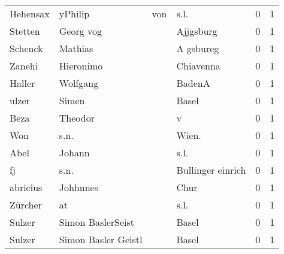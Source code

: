 \documentclass[10pt,a4paper,landscape]{article}
\begin{document}
\begin{longtable}{llllrr}
                 Hehensax &                            yPhilip &         von &                                        s.l. &          0 &         1 \\
                  Stetten &                          Georg vog &             &                                   Ajjgsburg &          0 &         1 \\
                  Schenck &                            Mathias &             &                                   A gsbureg &          0 &         1 \\
                   Zanehi &                          Hieronimo &             &                                   Chiavenna &          0 &         1 \\
                   Haller &                           Wolfgang &             &                                      BadenA &          0 &         1 \\
                    ulzer &                              Simen &             &                                       Basel &          0 &         1 \\
                     Beza &                            Theodor &             &                                           v &          0 &         1 \\
                      Won &                               s.n. &             &                                      Wien.  &          0 &         1 \\
                     Abel &                             Johann &             &                                        s.l. &          0 &         1 \\
                       fj &                               s.n. &             &                           Bullinger einrich &          0 &         1 \\
                 abricius &                           Johhnnes &             &                                        Chur &          0 &         1 \\
                  Zürcher &                                 at &             &                                        s.l. &          0 &         1 \\
                   Sulzer &                  Simon BaslerSeist &             &                                       Basel &          0 &         1 \\
                   Sulzer &                Simon Basler Geistl &             &                                       Basel &          0 &         1 \\

\end{longtable}
\end{document}
